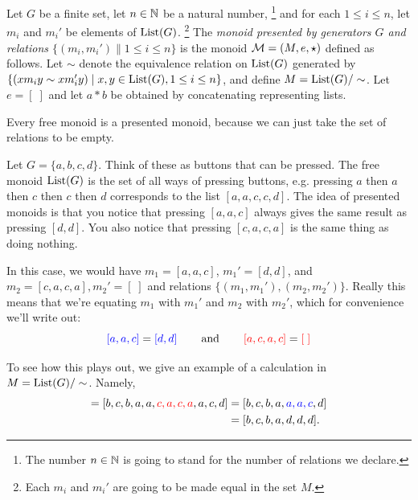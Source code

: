 \begin{definitionENG}\label{def:presented monoid}
Let $G$ be a finite set, let $n\in{\mathbb N}$ be a natural number,
\footnote{The number $n\in{\mathbb N}$ is going to stand for the number of relations we declare.} 
and for each $1\leq i\leq n$, let $m_i$ and $m_i'$ be elements of $\textnormal{List}(G)$.
\footnote{Each $m_i$ and $m_i'$ are going to be made equal in the set $M$.} 
The {\em monoid presented by generators $G$ and relations $\{(m_i,m_i')\|1\leq i\leq n\}$} is the monoid $\mathcal{M}=(M,e,\star)$ defined as follows. Let $\sim$ denote the equivalence relation on $\textnormal{List}(G)$ generated by $\{(xm_iy\sim xm_i'y){\;|\;}x,y\in\textnormal{List}(G), 1\leq i\leq n\}$, and define $M=\textnormal{List}(G)/\sim$. Let $e=[\;]$ and let $a * b$ be obtained by concatenating representing lists. 
\end{definitionENG}

\begin{definitionRUS}\label{def:presented monoid}
\end{definitionRUS}

\begin{remarkENG}
Every free monoid is a presented monoid, because we can just take the set of relations to be empty.
\end{remarkENG}

\begin{remarkRUS}
\end{remarkRUS}

\begin{exampleENG}\label{ex:presented monoid}
Let $G=\{a,b,c,d\}$. Think of these as buttons that can be pressed. The free monoid $\textnormal{List}(G)$ is the set of all ways of pressing buttons, e.g. pressing $a$ then $a$ then $c$ then $c$ then $d$ corresponds to the list $[a,a,c,c,d]$. The idea of presented monoids is that you notice that pressing $[a,a,c]$ always gives the same result as pressing $[d,d]$. You also notice that pressing $[c,a,c,a]$ is the same thing as doing nothing. 

In this case, we would have $m_1=[a,a,c]$, $m_1'=[d,d]$, and $m_2=[c,a,c,a], m_2'=[\;]$ and relations $\{(m_1,m_1'), (m_2,m_2')\}$. Really this means that we're equating $m_1$ with $m_1'$ and $m_2$ with $m_2'$, which for convenience we'll write out:
$${\color{blue}{[a,a,c]}}={\color{blue}{[d,d]}}\hspace{.3in}\textnormal{and}\hspace{.3in}{\color{red}{[a,c,a,c]}}={\color{red}{[\;]}}
$$ 

To see how this plays out, we give an example of a calculation in $M=\textnormal{List}(G)/\sim$. Namely, 
\begin{align*}
[b,c,b,{\color{blue}{d,d}},a,c,a,a,c,d] = [b,c,b,a,a,{\color{red}{c,a,c,a}},a,c,d] &= [b,c,b,a,{\color{blue}{a,a,c}},d]\\
&= [b,c,b,a,d,d,d].
\end{align*}
\end{exampleENG}

